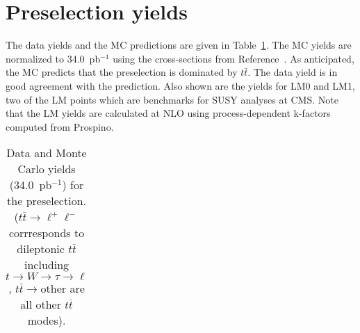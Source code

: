 \section{Preselection yields}
\label{sec:yields}

The data yields and the MC predictions are given in Table~\ref{tab:yields}.
The MC yields are normalized to 34.0~pb$^{-1}$ using the cross-sections
from Reference~\cite{ref:xsec}. As anticipated, the MC predicts that the 
preselection is dominated by $t\bar{t}$.  The data yield is in good agreement 
with the prediction. Also shown are the yields for LM0 and LM1, two of the LM 
points which are benchmarks for SUSY analyses at CMS. Note that the LM yields
are calculated at NLO using process-dependent k-factors computed from Prospino.


\begin{table}[htb]
\begin{center}
\caption{\label{tab:yields} Data and Monte Carlo yields (34.0~pb$^{-1}$) for the preselection.
($t\bar{t}\rightarrow \ell^{+}\ell^{-}$ corrresponds  to dileptonic $t\bar{t}$ including 
$t \to W \to \tau \to \ell$, $t\bar{t}\rightarrow \mathrm{other}$ are all other $t\bar{t}$ modes).}
\begin{tabular}{ccccc}


\end{tabular}
\end{center}
\end{table}
